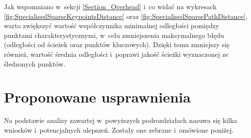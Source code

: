     Jak wspomniano w~sekcji \ref{Section_Overhead} i~co widać na wykresach \ref{fig:SpecialisedSparseKeypointsDistance} oraz \ref{fig:SpecialisedSparsePathDistance}, warto zwiększyć wartość współczynnika minimalnej odległości pomiędzy punktami charakterystycznymi, w~celu zmniejszenia maksymalnego błędu (odległości od ścieżek oraz punktów kluczowych). Dzięki temu zmniejszy się również, wartość średnia odległości i~poprawi jakość ścieżki wyznaczonej ze śledzonych punktów.

  \section{Proponowane usprawnienia}\label{Section_Usprawnienia}

    Na podstawie analizy zawartej w~powyższych podrozdziałach nasuwa się kilka wniosków i~potencjalnych ulepszeń. Zostały one zebrane i~omówione poniżej.


